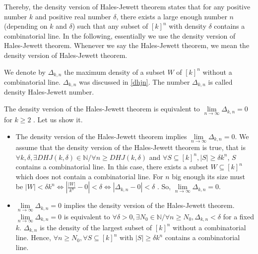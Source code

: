 Thereby, the density version of Hales-Jewett theorem states that for any positive number $k$ and positive real number $\delta$,  there exists a large enough number $n$ (depending on $k$ and $\delta$) such that  any subset of  $[k]^n $ with density $\delta$ contains a combinatorial line.
In the following, essentially  we use  the density version of  Hales-Jewett theorem. Whenever we say the Hales-Jewett theorem, we mean the density version of Hales-Jewett theorem.

We denote by $\Delta_{k,n}$ the maximum density of a subset $W$ of $[k]^n$ without a combinatorial line. $\Delta_{k,n}$
was discussed in  \eqref{dhjn}.
The number $\Delta_{k,n}$ is called density Hales-Jewett number.

The density version of the Hales-Jewett theorem is equivalent to  $\lim\limits_{n\longrightarrow \infty} \Delta_{k,n}=0$ for $k\geq 2$ \citep{furstenberg1991density}. Let us show it. \begin{itemize}
\item The density version of the Hales-Jewett theorem implies   $\lim\limits_{n\longrightarrow \infty} \Delta_{k,n}=0$. We assume that the density version of the Hales-Jewett theorem is true, that is $\forall k, \delta, \exists DHJ(k,\delta)  \in \mathbb{N} / \forall n\geq DHJ(k,\delta)$ and $\forall S \subseteq [k]^n, |S| \geq \delta k^n$, $S$ contains a combinatorial line. In this case,  there exists a subset $W \subseteq [k]^n$ which does not contain a combinatorial line. For $n$ big enough   its size must be $|W| < \delta k^n \Longleftrightarrow |\frac{|W|}{k^n}-0| <\delta \Longleftrightarrow |\Delta_{k,n}-0|<\delta $ . So, $\lim\limits_{n\longrightarrow \infty} \Delta_{k,n}=0$.
\item $\lim\limits_{n\longrightarrow \infty} \Delta_{k,n}=0$ implies the density version of the Hales-Jewett theorem. $\lim\limits_{n\longrightarrow \infty} \Delta_{k,n}=0$ is equivalent to $\forall  \delta >0, \exists N_0 \in \mathbb{N} /\forall n \geq N_0, \Delta_{k,n} < \delta$ for  a fixed $k.$ $ \Delta_{k,n}$ is the density of the largest subset of $[k]^n$ without a combinatorial line. Hence, $\forall n \geq N_0, \forall S \subseteq [k]^n$ with $|S| \geq \delta k^n$ contains a combinatorial line.
\end{itemize} 

